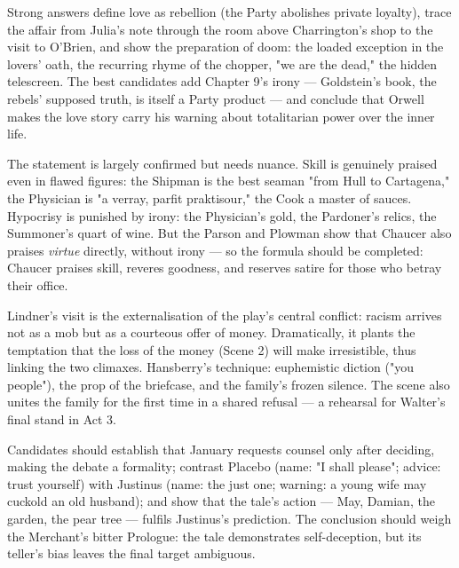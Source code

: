 \documentclass[11pt]{article}
\begin{document}
\begin{corrige}[Exercise 1]
Strong answers define love as rebellion (the Party abolishes private loyalty), trace the affair from Julia's note through the room above Charrington's shop to the visit to O'Brien, and show the preparation of doom: the loaded exception in the lovers' oath, the recurring rhyme of the chopper, "we are the dead," the hidden telescreen. The best candidates add Chapter 9's irony — Goldstein's book, the rebels' supposed truth, is itself a Party product — and conclude that Orwell makes the love story carry his warning about totalitarian power over the inner life.
\end{corrige}

\begin{corrige}[Exercise 2]
The statement is largely confirmed but needs nuance. Skill is genuinely praised even in flawed figures: the Shipman is the best seaman "from Hull to Cartagena," the Physician is "a verray, parfit praktisour," the Cook a master of sauces. Hypocrisy is punished by irony: the Physician's gold, the Pardoner's relics, the Summoner's quart of wine. But the Parson and Plowman show that Chaucer also praises \emph{virtue} directly, without irony — so the formula should be completed: Chaucer praises skill, reveres goodness, and reserves satire for those who betray their office.
\end{corrige}

\begin{corrige}[Exercise 3]
Lindner's visit is the externalisation of the play's central conflict: racism arrives not as a mob but as a courteous offer of money. Dramatically, it plants the temptation that the loss of the money (Scene 2) will make irresistible, thus linking the two climaxes. Hansberry's technique: euphemistic diction ("you people"), the prop of the briefcase, and the family's frozen silence. The scene also unites the family for the first time in a shared refusal — a rehearsal for Walter's final stand in Act 3.
\end{corrige}

\begin{corrige}[Exercise 4]
Candidates should establish that January requests counsel only after deciding, making the debate a formality; contrast Placebo (name: "I shall please"; advice: trust yourself) with Justinus (name: the just one; warning: a young wife may cuckold an old husband); and show that the tale's action — May, Damian, the garden, the pear tree — fulfils Justinus's prediction. The conclusion should weigh the Merchant's bitter Prologue: the tale demonstrates self-deception, but its teller's bias leaves the final target ambiguous.
\end{corrige}
\end{document}
